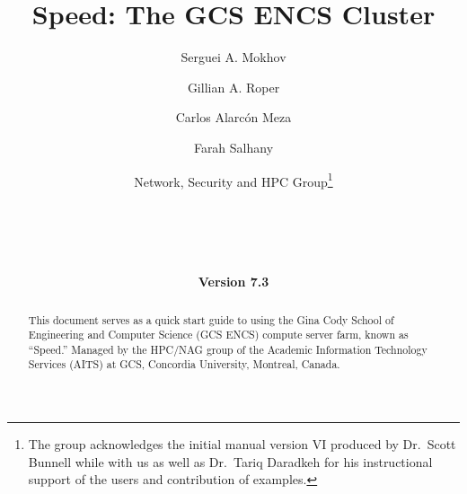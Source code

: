 \documentclass{easychair}
\begin{document}
%
\title{Speed: The GCS ENCS Cluster}



\date{\textbf{Version 7.3}}

\author{
    Serguei A. Mokhov
\and
    Gillian A. Roper
\and
    Carlos Alarcón Meza
\and
    Farah Salhany
\and
    Network, Security and HPC Group\footnote{The group acknowledges the initial manual version VI produced by Dr.~Scott Bunnell while with us
		as well as Dr.~Tariq Daradkeh for his instructional support of the users and contribution of examples.}\\
    \\
    \\
    \\
    \\
}

%

\maketitle
\begin{abstract}
This document serves as a quick start guide to using the Gina Cody School of 
Engineering and Computer Science (GCS ENCS) compute server farm, known as ``Speed.'' 
Managed by the HPC/NAG group of the Academic Information Technology Services (AITS) at GCS, 
Concordia University, Montreal, Canada.
\end{abstract}
\end{document}
